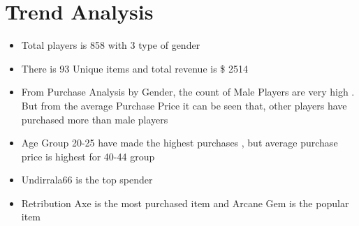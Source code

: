 \documentclass[11pt]{article}
\begin{document}
    \section{Trend Analysis}\begin{itemize}
    \item Total players is 858 with 3 type of gender
    \item There is 93 Unique items and total revenue is \$ 2514
    \item From Purchase Analysis by Gender, the count of Male Players are very high . But from the average Purchase Price it can be seen that, other players have purchased more than male players
    \item Age Group 20-25 have made the highest purchases , but average purchase price is highest for 40-44 group
    \item Undirrala66 is the top spender 
    \item Retribution Axe is the  most purchased item and Arcane Gem is the popular item
\end{itemize}


    
    
    
    
\end{document}
